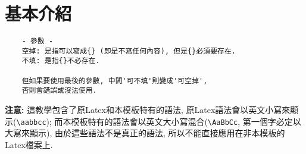 \section{基本介紹}


  \begin{framed}
  \begin{verbatim}
    - 參數 -
    空掉: 是指可以寫成{} (即是不寫任何內容), 但是{}必須要存在.
    不填: 是指{}不必存在.

    但如果要使用最後的參數, 中間'可不填'則變成'可空掉',
    否則會錯誤或沒法使用.
  \end{verbatim}
  \end{framed}

{\bf 注意:} 這教學包含了原Latex和本模板特有的語法, 原Latex語法會以英文小寫來顯示(\verb|\aabbcc|); 而本模板特有的語法會以英文大小寫混合(\verb|\AaBbCc|, 第一個字必定以大寫來顯示), 由於這些語法不是真正的語法, 所以不能直接應用在非本模板的Latex檔案上.

\EndChapter
